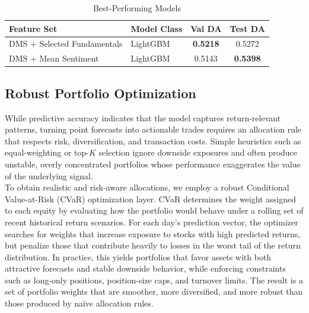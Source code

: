\documentclass[11pt]{article}
\begin{document}
\begin{table}[H]
\centering
\caption{Best-Performing Models}
\label{tab:best_models}
\begin{tabular}{llcc}
\toprule
\textbf{Feature Set} 
& \textbf{Model Class} 
& \textbf{Val DA} 
& \textbf{Test DA} \\
\midrule

DMS + Selected Fundamentals
& LightGBM
& \textbf{0.5218}
& 0.5272 \\

DMS + Mean Sentiment
& LightGBM
& 0.5143
& \textbf{0.5398} \\

\bottomrule
\end{tabular}
\end{table}

\subsection{Robust Portfolio Optimization}

While predictive accuracy indicates that the model captures return-relevant
patterns, turning point forecasts into actionable trades requires an allocation
rule that respects risk, diversification, and transaction costs. Simple
heuristics such as equal-weighting or top-$K$ selection ignore downside
exposures and often produce unstable, overly concentrated portfolios whose
performance exaggerates the value of the underlying signal.\\

\noindent To obtain realistic and risk-aware allocations, we employ a robust
Conditional Value-at-Risk (CVaR) optimization layer. CVaR determines the weight
assigned to each equity by evaluating how the portfolio would behave under a
rolling set of recent historical return scenarios. For each day’s prediction
vector, the optimizer searches for weights that increase exposure to stocks with
high predicted returns, but penalize those that contribute heavily to losses in
the worst tail of the return distribution. In practice, this yields portfolios
that favor assets with both attractive forecasts and stable downside behavior,
while enforcing constraints such as long-only positions, position-size caps, and
turnover limits. The result is a set of portfolio weights that are smoother,
more diversified, and more robust than those produced by naïve allocation
rules.
\end{document}
